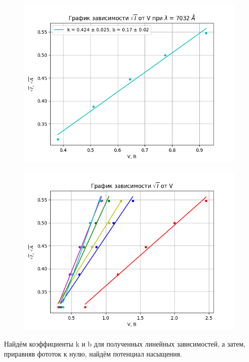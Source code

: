 \documentclass[a4paper,12pt]{article}
\begin{document}
\begin{figure}[H]
\begin{minipage}[b]{0.48\textwidth}
  \end{minipage}
  \hfill
  \begin{minipage}[b]{0.48\textwidth}
    \includegraphics[width=\textwidth]{line6.png}
  \end{minipage}
\end{figure}

\begin{figure}[H]
\centering
\includegraphics[scale=0.8]{graph2.png}
\end{figure}

Найдём коэффициенты k и b для полученных линейных зависимостей, а затем, приравняв фототок к нулю, найдём потенциал насыщения.
\end{document}
